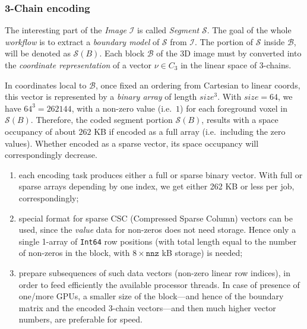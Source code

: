 \documentclass[11pt, oneside]{amsart}   	%
\begin{document}
\subsubsection*{3-Chain encoding}\label{chain-coding}
The interesting part of the \emph{Image} $\mathcal{I}$ is called \emph{Segment} $\mathcal{S}$. The goal of the whole \emph{workflow} is to extract a \emph{boundary model} of $\mathcal{S}$ from $\mathcal{I}$. The portion of $\mathcal{S}$ inside $\mathcal{B}$, will be denoted as $\mathcal{S}(B)$.
Each block $\mathcal{B}$ of the 3D image must by converted into the \emph{coordinate representation} of a vector $\nu\in C_3$ in the linear space  of 3-chains. 

In coordinates local to $\mathcal{B}$, once fixed an ordering from Cartesian to linear coords, this vector is represented by a \emph{binary array} of length $size^3$. With $size=64$, we have $64^3=262144$,  with a non-zero value (i.e.~$1$) for each foreground voxel in $\mathcal{S}(B)$. Therefore, the coded segment portion $\mathcal{S}(B)$, results with a space occupancy of about $262$ KB if encoded as a full array (i.e.~including the zero values). Whether encoded as a sparse vector, its space occupancy will correspondingly decrease.

\begin{enumerate}

\item each encoding task produces either a full or sparse binary vector. With full or sparse arrays depending by one index, we get either 262 KB or less per job, correspondingly;

\item special format for sparse CSC (Compressed Sparse Column) vectors can be used, since the \emph{value} data for non-zeros does not need storage. Hence only a single 1-array of \texttt{Int64} row positions (with total length equal to the number of non-zeros in the block, with $8\times\mathtt{nnz}$ kB storage) is needed;

\item prepare subsequences of such data vectors (non-zero linear row indices), in order to feed efficiently the available processor threads.
In case of presence of one/more GPUs, a smaller size of the block---and hence of the boundary matrix and the encoded 3-chain vectors---and then much higher vector numbers, are preferable for speed.

\end{enumerate}
\end{document}
